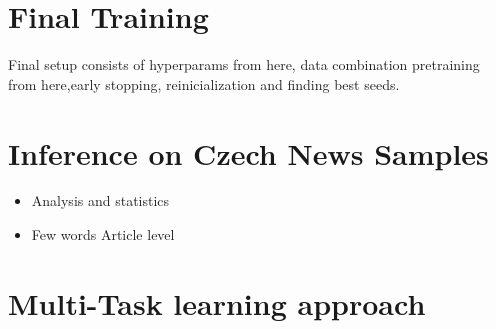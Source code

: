 \section{Final Training}
Final setup consists of hyperparams from here, data combination pretraining from here,early stopping, reinicialization and finding best seeds.
 
 
 
\section{Inference on Czech News Samples}
\begin{itemize}
    \item Analysis and statistics
    \item Few words Article level
\end{itemize}


\section{Multi-Task learning approach}\label{mtl}